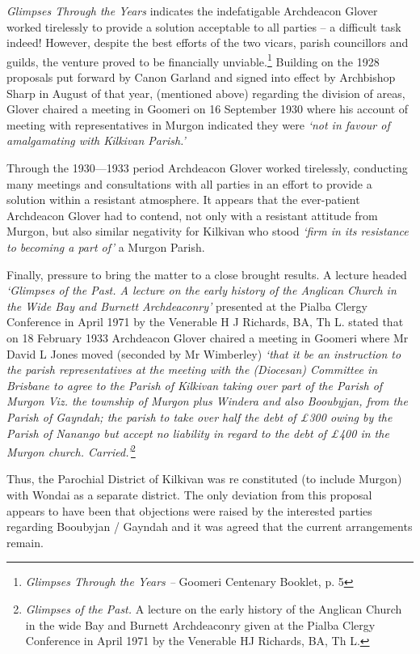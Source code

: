 \emph{Glimpses Through the Years} indicates the indefatigable Archdeacon Glover worked tirelessly to provide a solution acceptable to all parties -- a difficult task indeed! However, despite the best efforts of the two vicars, parish councillors and guilds, the venture proved to be financially unviable.\footnote{\emph{Glimpses Through the Years --} Goomeri Centenary Booklet, p. 5} Building on the 1928 proposals put forward by Canon Garland and signed into effect by Archbishop Sharp in August of that year, (mentioned above) regarding the division of areas, Glover chaired a meeting in Goomeri on 16 September 1930 where his account of meeting with representatives in Murgon indicated they were \emph{`not in favour of amalgamating with Kilkivan Parish.'}

Through the 1930---1933 period Archdeacon Glover worked tirelessly, conducting many meetings and consultations with all parties in an effort to provide a solution within a resistant atmosphere. It appears that the ever-patient Archdeacon Glover had to contend, not only with a resistant attitude from Murgon, but also similar negativity for Kilkivan who stood \emph{`firm in its resistance to becoming a part of'} a Murgon Parish.

Finally, pressure to bring the matter to a close brought results. A lecture headed \emph{`Glimpses of the Past. A lecture on the early history of the Anglican Church in the Wide Bay and Burnett Archdeaconry'} presented at the Pialba Clergy Conference in April 1971 by the Venerable H J Richards, BA, Th L. stated that on 18 February 1933 Archdeacon Glover chaired a meeting in Goomeri where Mr David L Jones moved (seconded by Mr Wimberley) \emph{`that it be an instruction to the parish representatives at the meeting with the (Diocesan) Committee in Brisbane to agree to the Parish of Kilkivan taking over part of the Parish of Murgon Viz. the township of Murgon plus Windera and also Booubyjan, from the Parish of Gayndah; the parish to take over half the debt of £300 owing by the Parish of Nanango but accept no liability in regard to the debt of £400 in the Murgon church. Carried.'}\footnote{\emph{Glimpses of the Past.} A lecture on the early history of the Anglican Church in the wide Bay and Burnett Archdeaconry given at the Pialba Clergy Conference in April 1971 by the Venerable HJ Richards, BA, Th L.}

Thus, the Parochial District of Kilkivan was re constituted (to include Murgon) with Wondai as a separate district. The only deviation from this proposal appears to have been that objections were raised by the interested parties regarding Booubyjan / Gayndah and it was agreed that the current arrangements remain.

